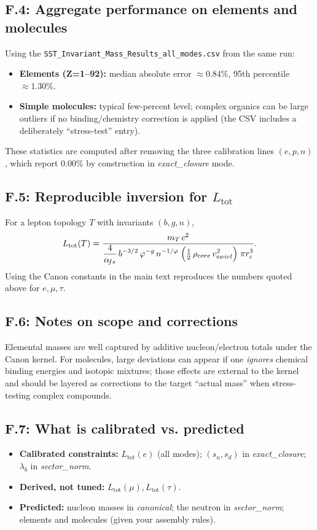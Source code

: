 \documentclass[smallextended]{svjour3}       %
\begin{document}
		\subsection*{F.4: Aggregate performance on elements and molecules}
		Using the \texttt{SST\_Invariant\_Mass\_Results\_all\_modes.csv} from the same run:
		\begin{itemize}
		\item \textbf{Elements (Z=1–92):} median absolute error \(\approx 0.84\%\), 95th percentile \(\approx 1.30\%\).
		\item \textbf{Simple molecules:} typical few-percent level; complex organics can be large outliers if no binding/chemistry correction is applied (the CSV includes a deliberately “stress-test” entry).
		\end{itemize}
		These statistics are computed after removing the three calibration lines \((e,p,n)\), which report \(0.00\%\) by construction in \textit{exact\_closure} mode.

		\subsection*{F.5: Reproducible inversion for \(L_{\text{tot}}\)}
		For a lepton topology \(T\) with invariants \((b,g,n)\),
		\[
		L_{\text{tot}}(T)
		= \frac{ m_T\,c^2 }{ \displaystyle \frac{4}{\alpha_{\!fs}}\,b^{-3/2}\,\varphi^{-g}\,n^{-1/\varphi}
		\;
		\Big(\tfrac12\,\rho_{\textrm core}\,v_{\textrm swirl}^{2}\Big)\;\pi r_c^{3} }.
		\]
		Using the Canon constants in the main text reproduces the numbers quoted above for \(e,\mu,\tau\).

		\subsection*{F.6: Notes on scope and corrections}
		Elemental masses are well captured by additive nucleon/electron totals under the Canon kernel. For molecules, large deviations can appear if one \emph{ignores} chemical binding energies and isotopic mixtures; those effects are external to the kernel and should be layered as corrections to the target “actual mass” when stress-testing complex compounds.

		\subsection*{F.7: What is calibrated vs. predicted}
		\begin{itemize}
		\item \textbf{Calibrated constraints:} \(L_{\text{tot}}(e)\) (all modes); \((s_u,s_d)\) in \textit{exact\_closure}; \(\lambda_b\) in \textit{sector\_norm}.
		\item \textbf{Derived, not tuned:} \(L_{\text{tot}}(\mu),L_{\text{tot}}(\tau)\).
		\item \textbf{Predicted:} nucleon masses in \textit{canonical}; the neutron in \textit{sector\_norm}; elements and molecules (given your assembly rules).
		\end{itemize}
\end{document}
